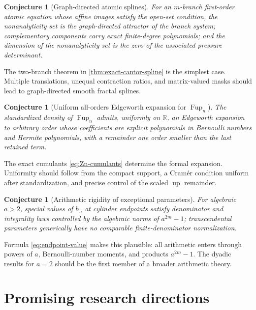 \documentclass[11pt]{article}
\newtheorem{conjecture}[theorem]{Conjecture}
\theoremstyle{definition}
\theoremstyle{remark}
\newcommand{\Up}{\operatorname{up}}
\newcommand{\Fup}{\operatorname{Fup}}
\newcommand{\R}{\mathbb{R}}
\begin{document}
\begin{conjecture}[Graph-directed atomic splines]
\label{conj:graph-directed}
For an \(m\)-branch first-order atomic equation whose affine images satisfy the open-set condition, the nonanalyticity set is the graph-directed attractor of the branch system; complementary components carry exact finite-degree polynomials; and the dimension of the nonanalyticity set is the zero of the associated pressure determinant.
\end{conjecture}

The two-branch theorem in \cref{thm:exact-cantor-spline} is the simplest case.  Multiple translations, unequal contraction ratios, and matrix-valued masks should lead to graph-directed smooth fractal splines.

\begin{conjecture}[Uniform all-orders Edgeworth expansion for \(\Fup_n\)]
\label{conj:fup-edgeworth}
The standardized density of \(\Fup_n\) admits, uniformly on \(\R\), an Edgeworth expansion to arbitrary order whose coefficients are explicit polynomials in Bernoulli numbers and Hermite polynomials, with a remainder one order smaller than the last retained term.
\end{conjecture}

The exact cumulants \eqref{eq:Zn-cumulants} determine the formal expansion.  Uniformity should follow from the compact support, a Cram\'er condition uniform after standardization, and precise control of the scaled \(\Up\) remainder.

\begin{conjecture}[Arithmetic rigidity of exceptional parameters]
\label{conj:arithmetic-a}
For algebraic \(a>2\), special values of \(h_a\) at cylinder endpoints satisfy denominator and integrality laws controlled by the algebraic norms of \(a^{2m}-1\); transcendental parameters generically have no comparable finite-denominator normalization.
\end{conjecture}

Formula \eqref{eq:endpoint-value} makes this plausible: all arithmetic enters through powers of \(a\), Bernoulli-number moments, and products \(a^{2m}-1\).  The dyadic results for \(a=2\) should be the first member of a broader arithmetic theory.

\section{Promising research directions}
\label{sec:future}
\end{document}
